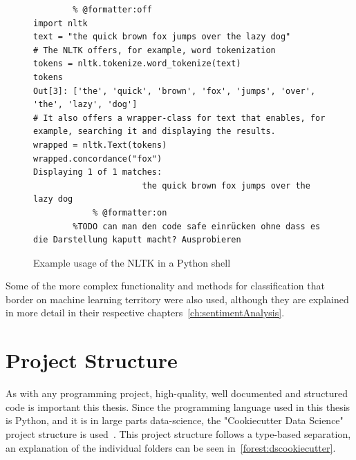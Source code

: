 \begin{figure}
    \caption{Example usage of the NLTK in a Python shell}
    \label{code:nltk}
    \begin{verbatim}
        % @formatter:off
import nltk
text = "the quick brown fox jumps over the lazy dog"
# The NLTK offers, for example, word tokenization
tokens = nltk.tokenize.word_tokenize(text)
tokens
Out[3]: ['the', 'quick', 'brown', 'fox', 'jumps', 'over', 'the', 'lazy', 'dog']
# It also offers a wrapper-class for text that enables, for example, searching it and displaying the results.
wrapped = nltk.Text(tokens)
wrapped.concordance("fox")
Displaying 1 of 1 matches:
                      the quick brown fox jumps over the lazy dog
            % @formatter:on
        %TODO can man den code safe einrücken ohne dass es die Darstellung kaputt macht? Ausprobieren
    \end{verbatim}
\end{figure}

Some of the more complex functionality and methods for classification that border on machine learning territory were also used,
although they are explained in more detail in their respective chapters~\ref{ch:sentimentAnalysis}.

\section{Project Structure}
\label{sec:projectStructure}

As with any programming project, high-quality, well documented and structured code is important this thesis.
Since the programming language used in this thesis is Python, and it is in large parts data-science,
the "Cookiecutter Data Science" %
project structure is used~\cite{dsCookieCutter}.
This project structure follows a type-based separation, an explanation of the individual folders can be seen in~\ref{forest:dscookiecutter}.

